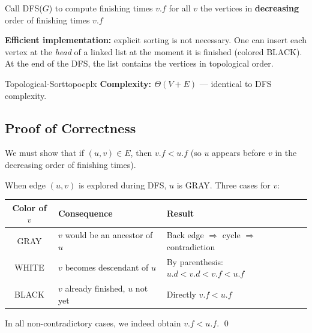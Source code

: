 \begin{algorithm}[H]
\caption{Topological-Sort($G$)}
\begin{algorithmic}[1]
\State Call \textsc{DFS}($G$) to compute finishing times $v.f$ for all $v$
\State \Return the vertices in \textbf{decreasing} order of finishing times $v.f$
\end{algorithmic}
\end{algorithm}

\textbf{Efficient implementation:} explicit sorting is not necessary.
One can insert each vertex at the \emph{head} of a linked list at the moment
it is finished (colored BLACK). At the end of the DFS, the list contains the vertices
in topological order.

\begin{complexity}{Topological-Sort}{topocplx}
\textbf{Complexity: $\Theta(V + E)$} — identical to DFS complexity.
\end{complexity}

\subsection{Proof of Correctness}

We must show that if $(u, v) \in E$, then $v.f < u.f$ (so $u$ appears before
$v$ in the decreasing order of finishing times).

When edge $(u,v)$ is explored during DFS, $u$ is GRAY. Three cases for $v$:

\begin{center}
\renewcommand{\arraystretch}{1.4}
\begin{tabular}{cll}
\toprule
\textbf{Color of $v$} & \textbf{Consequence} & \textbf{Result} \\
\midrule
GRAY & $v$ would be an ancestor of $u$ & Back edge $\Rightarrow$ cycle $\Rightarrow$ contradiction \\
WHITE & $v$ becomes descendant of $u$ & By parenthesis: $u.d < v.d < v.f < u.f$ \\
BLACK & $v$ already finished, $u$ not yet & Directly $v.f < u.f$ \\
\bottomrule
\end{tabular}
\end{center}

In all non-contradictory cases, we indeed obtain $v.f < u.f$. \qed

